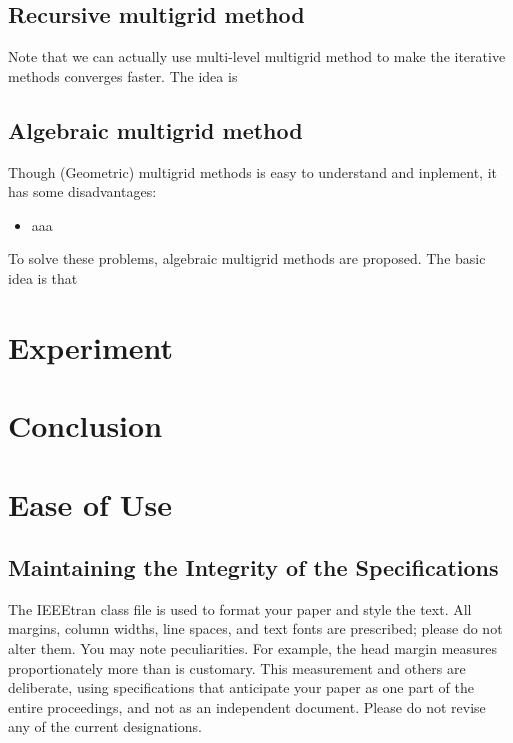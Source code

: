 \documentclass[onecolumn, conference]{IEEEtran}
\begin{document}
\subsection{Recursive multigrid method}
Note that we can actually use multi-level multigrid method to make the iterative methods converges faster. The idea is 




\subsection{Algebraic multigrid method}
Though (Geometric) multigrid methods is easy to understand and inplement, it has some disadvantages:
\begin{itemize}
    \item aaa
\end{itemize}

To solve these problems, algebraic multigrid methods are proposed. The basic idea is that



\section{Experiment}




\section{Conclusion}





















\section{Ease of Use}

\subsection{Maintaining the Integrity of the Specifications}

The IEEEtran class file is used to format your paper and style the text. All margins, 
column widths, line spaces, and text fonts are prescribed; please do not 
alter them. You may note peculiarities. For example, the head margin
measures proportionately more than is customary. This measurement 
and others are deliberate, using specifications that anticipate your paper 
as one part of the entire proceedings, and not as an independent document. 
Please do not revise any of the current designations.
\end{document}
